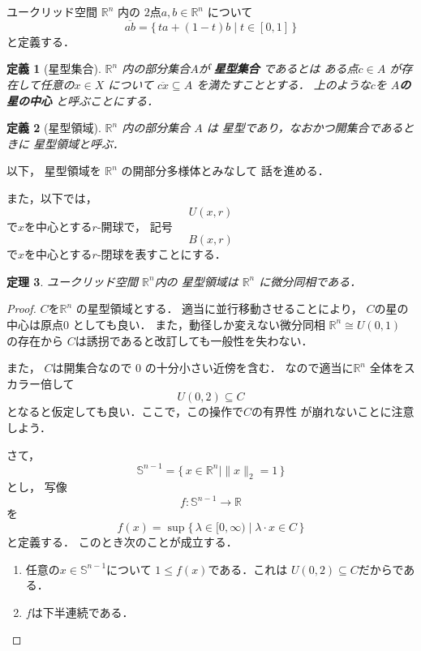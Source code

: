 \documentclass[leqno, a4paper, 12pt, dvipdfmx]{jsarticle}
\newtheorem{thm}{定理}
\newtheorem{df}[thm]{定義}
\newcommand{\rr}{\mathbb{R}}
\begin{document}
ユークリッド空間
$\rr^{n}$
内の
$2$点$a, b\in \rr^{n}$
について
\[
\overline{ab}
=\{\,ta+(1-t)b\mid t\in [0, 1] \, \}
\]
と定義する．
\begin{df}[星型集合]
$\rr^{n}$
内の部分集合$A$が
\textbf{星型集合}
であるとは
ある点$c\in A$
が存在して任意の$x\in X$
について
$\overline{cx}\subseteq A$
を満たすこととする．
上のような$c$を
\textbf{$A$の星の中心}
と呼ぶことにする．
\end{df}



\begin{df}[星型領域]
$\rr^{n}$
内の部分集合
$A$
は
星型であり，なおかつ開集合であるときに
星型領域と呼ぶ．
\end{df}

以下，
星型領域を
$\rr^{n}$
の開部分多様体とみなして
話を進める．

また，以下では，
\[
U(x, r)
\]
で$x$を中心とする$r$-開球で，
記号
\[
B(x, r)
\]
で$x$を中心とする$r$-閉球を表すことにする．



\begin{thm}\label{thm:main1}
ユークリッド空間
$\rr^{n}$内の
星型領域は
$\rr^{n}$
に微分同相である．
\end{thm}
\begin{proof}
$C$を$\rr^{n}$
の星型領域とする．
適当に並行移動させることにより，
$C$の星の中心は原点$0$
としても良い．
また，動径しか変えない微分同相
$\rr^{n}\cong U(0, 1)$
の存在から
$C$は誘拐であると改訂しても一般性を失わない．

また，
$C$は開集合なので
$0$
の十分小さい近傍を含む．
なので適当に$\rr^{n}$
全体をスカラー倍して
\[
U(0, 2)\subseteq C
\]
となると仮定しても良い．ここで，この操作で$C$の有界性
が崩れないことに注意しよう．

さて，
\[
\mathbb{S}^{n-1}=\{\, x\in \rr^{n}\mid \|x\|_{2}=1 \, \}
\]
とし，
写像
\[
f\colon \mathbb{S}^{n-1}\to \rr
\]
を
\[
f(x)=\sup\{\, \lambda\in [0, \infty)\mid \lambda\cdot x\in C\, \}
\]
と定義する．
このとき次のことが成立する．
\begin{enumerate}
\item 
任意の$x\in \mathbb{S}^{n-1}$について
$1\le f(x)$である．これは
$U(0, 2)\subseteq C$だからである．
\item 
$f$は下半連続である．
\end{enumerate}
\end{proof}
\end{document}
